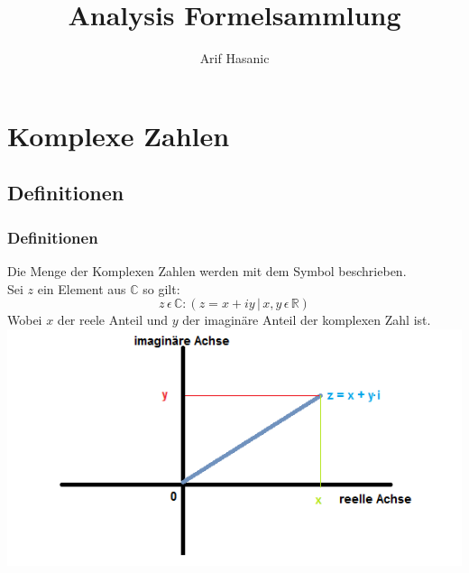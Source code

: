 \documentclass[a4paper]{scrartcl}
\title{Analysis Formelsammlung}
\author{Arif Hasanic}
\begin{document}
    \maketitle
    \newpage
    \tableofcontents
    \newpage
    
    \section{Komplexe Zahlen}
        \subsection{Definitionen}
            \subsubsection{Definitionen}
                Die Menge der Komplexen Zahlen werden mit dem Symbol  beschrieben.\\
                Sei \(z\) ein Element aus \(\mathbb{C}\) so gilt:
                \begin{equation*}
                    z \, \epsilon \, \mathbb{C} : (z = x + iy \,|\, x,y \,\epsilon \, \mathbb{R})
                \end{equation*}
                Wobei \(x\) der reele Anteil und \(y\) der imaginäre Anteil der komplexen Zahl ist. \\
                \includegraphics{c}
            
\end{document}
